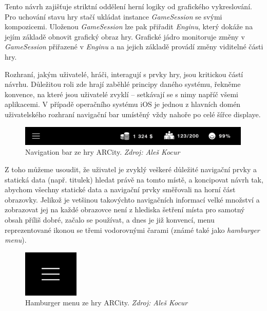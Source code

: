 \documentclass[twoside,12pt]{article}
\begin{document}
Tento návrh zajišťuje striktní oddělení herní logiky od grafického vykreslování. Pro uchování stavu hry stačí ukládat instance \textit{GameSession} se svými kompozicemi. Uloženou \textit{GameSession} lze pak přiřadit \textit{Enginu}, který dokáže na jejím základě obnovit grafický obraz hry. Grafické jádro monitoruje změny v \textit{GameSession} přiřazené v \textit{Enginu} a na jejich základě provádí změny viditelné části hry. 


Rozhraní, jakým uživatelé, hráči, interagují s prvky hry, jsou kritickou částí návrhu. Důležitou roli zde hrají zaběhlé principy daného systému, řekněme konvence, na které jsou uživatelé zvyklí -- setkávají se s nimy napříč všemi aplikacemi. V případě operačního systému iOS je jednou z hlavních domén uživatelského rozhraní navigační bar umístěný vždy nahoře po celé šířce displaye.    

\begin{figure}[H]
\centering
    \includegraphics[width=420px, center]{images/nav_bar_iphone.png}
\captionsetup{justification=centering}
    \caption[]{Navigation bar ze hry ARCity. \textit{Zdroj: Aleš Kocur}}
    \label{navigation_bar}
\end{figure}

Z toho můžeme usoudit, že uživatel je zvyklý veškeré důležité navigační prvky a statická data (např. titulek) hledat právě na tomto místě, a koncipovat návrh tak, abychom všechny statické data a navigační prvky směřovali na horní část obrazovky. Jelikož je vetšinou takovýchto navigačních informací velké množství a zobrazovat jej na každé obrazovce není z hlediska šetření místa pro samotný obsah příliš dobré, začalo se používat, a dnes je již konvencí, menu reprezentované ikonou se třemi vodorovnými čarami (známé také jako \textit{hamburger menu}). 

\begin{figure}[H]
\centering
    \includegraphics[width=100px, center]{images/hamburger_menu.png}
\captionsetup{justification=centering}
    \caption[]{Hamburger menu ze hry ARCity. \textit{Zdroj: Aleš Kocur}}
    \label{hamburger-menu}
\end{figure}
\end{document}
